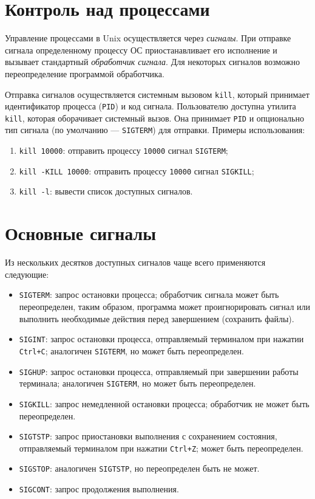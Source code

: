 \documentclass[listings]{labreport}
\begin{document}
\maketitlepage

\section*{Контроль над процессами}

Управление процессами в Unix осуществляется через \textit{сигналы}. При отправке сигнала определенному процессу
ОС приостанавливает его исполнение и вызывает стандартный \textit{обработчик сигнала}. Для некоторых сигналов возможно
переопределение программой обработчика.

Отправка сигналов осуществляется системным вызовом \texttt{kill}, который принимает идентификатор процесса (\texttt{PID})
и код сигнала. Пользователю доступна утилита \texttt{kill}, которая оборачивает системный вызов. Она принимает \texttt{PID}
и опционально тип сигнала (по умолчанию — \texttt{SIGTERM}) для отправки. Примеры использования:

\begin{enumerate}
\item \texttt{kill 10000}: отправить процессу \texttt{10000} сигнал \texttt{SIGTERM};
\item \texttt{kill -KILL 10000}: отправить процессу \texttt{10000} сигнал \texttt{SIGKILL};
\item \texttt{kill -l}: вывести список доступных сигналов.
\end{enumerate}

\section*{Основные сигналы}

Из нескольких десятков доступных сигналов чаще всего применяются следующие:

\begin{itemize}
\item \texttt{SIGTERM}: запрос остановки процесса; обработчик сигнала может быть переопределен, таким образом, программа
  может проигнорировать сигнал или выполнить необходимые действия перед завершением (сохранить файлы).
\item \texttt{SIGINT}: запрос остановки процесса, отправляемый терминалом при нажатии \texttt{Ctrl+C}; аналогичен
  \texttt{SIGTERM}, но может быть переопределен.
\item \texttt{SIGHUP}: запрос остановки процесса, отправляемый при завершении работы терминала; аналогичен
  \texttt{SIGTERM}, но может быть переопределен.
\item \texttt{SIGKILL}: запрос немедленной остановки процесса; обработчик не может быть переопределен.
\item \texttt{SIGTSTP}: запрос приостановки выполнения с сохранением состояния, отправляемый терминалом при нажатии
  \texttt{Ctrl+Z}; может быть переопределен.
\item \texttt{SIGSTOP}: аналогичен \texttt{SIGTSTP}, но переопределен быть не может.
\item \texttt{SIGCONT}: запрос продолжения выполнения.
\end{itemize}
\end{document}
